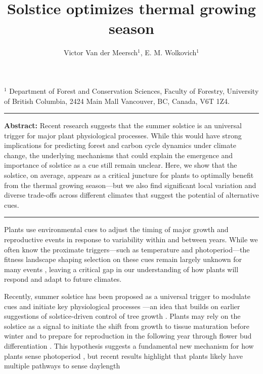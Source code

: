 \documentclass[11pt,letter]{article}
\begin{document}
\title{Solstice optimizes thermal growing season}

\author{Victor Van der Meersch$^{1}$, E. M. Wolkovich$^{1}$}
\date{}
\maketitle 

$^1$ Department of Forest and Conservation Sciences, Faculty of Forestry, University of British Columbia, 2424 Main Mall
Vancouver, BC, Canada, V6T 1Z4. \\

\noindent\rule{\textwidth}{0.3pt}
\textbf{Abstract:} Recent research suggests that the summer solstice is an universal trigger for major plant physiological processes. While this would have strong implications for %
 predicting forest and carbon cycle dynamics under climate change, the underlying mechanisms that could explain the emergence and importance of solstice as a cue still remain unclear. Here, we show that the solstice, on average, appears as a critical juncture for plants to optimally benefit from the thermal growing season---but we also find significant local variation and diverse trade-offs across different climates that suggest the potential of alternative cues.\\ %
\noindent\rule{\textwidth}{0.3pt}

\vspace{0.4cm}

Plants use environmental cues to adjust the timing of major growth and reproductive events in response to variability within and between years. While we often know the proximate triggers---such as temperature and photoperiod---the fitness landscape shaping selection on these cues remain largely unknown for many events \citep{Chuine2017}, leaving a critical gap in our understanding of how plants will respond and adapt to future climates.

Recently, summer solstice has been proposed as a universal trigger to modulate cues and initiate key physiological processes \citep{Zohner2023, Journe2024}---an idea that builds on earlier suggestions of solstice-driven control of tree growth \citep{Rossi2006}. 
Plants may rely on the solstice as a signal to initiate the shift from growth to tissue maturation before winter and to prepare for reproduction in the following year through flower bud differentiation \citep{Rossi2006, Zohner2023, Journe2024}. This hypothesis suggests a fundamental new mechanism for how plants sense photoperiod \citep{Gendron2023}, but recent results highlight that plants likely have multiple pathways to sense daylength  \citep{wang2024plants} 
\end{document}
